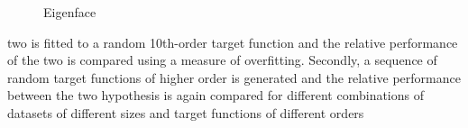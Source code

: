 \documentclass[a4paper,10pt]{article}
\begin{document}
\begin{figure}[H]
{  }

  \caption{Eigenface}
\end{figure}

two is fitted to a random 10th-order target function and the relative performance of the two is compared using a measure of overfitting.
Secondly, a sequence of random target functions of higher order is generated and the
relative performance between the two hypothesis is again compared for different combinations of
datasets of different sizes and target functions of different orders
\end{document}
